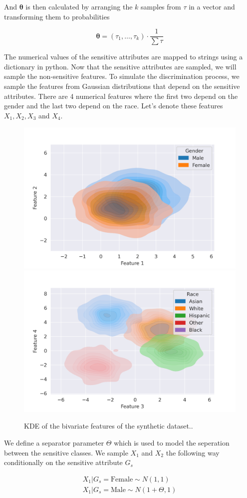 And $\boldsymbol{\theta}$ is then calculated by arranging the $k$ samples from $\tau$ in a vector and transforming them to probabilities 

\begin{equation*}
    \boldsymbol{\theta} = ({\tau_1, \dots, \tau_k}) \cdot \frac{1}{\sum \tau}
\end{equation*}

The numerical values of the sensitive attributes are mapped to strings using a dictionary in python. Now that the sensitive attributes are sampled, we will sample the non-sensitive features. To simulate the discrimination process, we sample the features from Gaussian distributions that depend on the sensitive attributes. There are 4 numerical features where the first two depend on the gender and the last two depend on the race. Let's denote these features $X_1, X_2, X_3$ and $X_4$.

\begin{figure}
    \centering
    \includegraphics[width=0.49\linewidth]{figures/synthetic-gender.png}
    \includegraphics[width=0.49\linewidth]{figures/synthetic-race.png}
    \caption{KDE of the bivariate features of the synthetic dataset..}
    \label{fig:synthdatasetfeatures}
\end{figure}


We define a separator parameter $\Theta$ which is used to model the seperation between the sensitive classes. We sample $X_1$ and $X_2$ the following way conditionally on the sensitive attribute $G_s$

\begin{equation*}
    \begin{aligned}
           X_1 | G_s = \text{Female} \sim N(1, 1) \\ 
           X_1 | G_s = \text{Male} \sim N(1 + \Theta, 1)
    \end{aligned}
\end{equation*}

